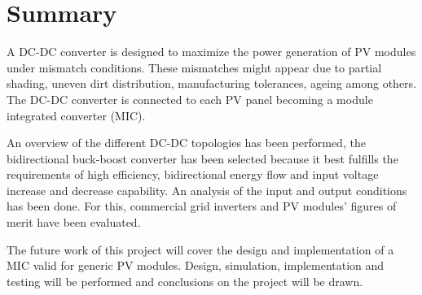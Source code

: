 \chapter*{Summary}


A DC-DC converter is designed to maximize the power generation of PV modules under mismatch conditions. These mismatches might appear due to partial shading, uneven dirt distribution, manufacturing tolerances, ageing among others. The DC-DC converter is connected to each PV panel becoming a module integrated converter (MIC).


An overview of the different DC-DC topologies has been performed, the bidirectional buck-boost converter has been selected because it best fulfills the requirements of high efficiency, bidirectional energy flow and input voltage increase and decrease capability. An analysis of the input and output conditions has been done. For this, commercial grid inverters and PV modules' figures of merit have been evaluated.


The future work of this project will cover the design and implementation of a MIC valid for generic PV modules. Design, simulation, implementation and testing will be performed and conclusions on the project will be drawn.
